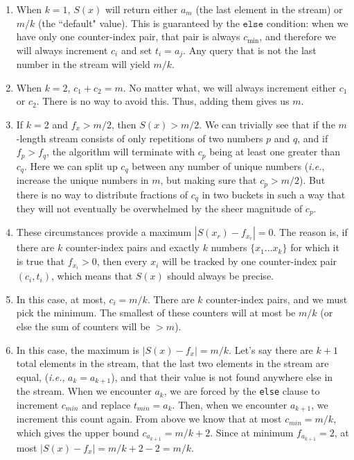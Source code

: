 \documentclass[fleqn]{article}
\begin{document}
\begin{enumerate}
\renewcommand{\labelenumi}{(\Alph{enumi})}


\item When $k=1$, $S(x)$ will return either $a_m$ (the last element in the stream) or $m/k$ (the ``default" value). This is guaranteed by the $\texttt{else}$ condition: when we have only one counter-index pair, that pair is always $c_{\mbox{min}}$, and therefore we will always increment $c_i$ and set $t_i = a_j$. Any query that is not the last number in the stream will yield $m/k$.

\item When $k=2$, $c_1 + c_2 = m$. No matter what, we will always increment either $c_1$ or $c_2$. There is no way to avoid this. Thus, adding them gives us $m$.

\item If $k=2$ and $f_x > m/2$, then $S(x) > m/2$. We can trivially see that if the $m$-length stream consists of only repetitions of two numbers $p$ and $q$, and if $f_p > f_q$, the algorithm will terminate with $c_p$ being at least one greater than $c_q$. Here we can split up $c_q$ between any number of unique numbers (\textit{i.e.}, increase the unique numbers in $m$, but making sure that $c_p > m/2$). But there is no way to distribute fractions of $c_q$ in two buckets in such a way that they will not eventually be overwhelmed by the sheer magnitude of $c_p$.

\item These circumstances provide a maximum $|S(x_r) - f_{x_r}| = 0$. The reason is, if there are $k$ counter-index pairs and exactly $k$ numbers $\{x_1 \ldots x_k\}$ for which it is true that $f_{x_i} > 0$, then every $x_i$ will be tracked by one counter-index pair $(c_i, t_i)$, which means that $S(x)$ should always be precise.

\item In this case, at most, $c_i = m/k$. There are $k$ counter-index pairs, and we must pick the minimum. The smallest of these counters will at most be $m/k$ (or else the sum of counters will be $> m$).

\item In this case, the maximum is $|S(x) - f_x| = m/k$. Let's say there are $k + 1$ total elements in the stream, that the last two elements in the stream are equal, (\textit{i.e.}, $a_k = a_{k+1}$), and that their value is not found anywhere else in the stream. When we encounter $a_k$, we are forced by the \texttt{else} clause to increment $c_{min}$ and replace $t_{min} = a_k$. Then, when we encounter $a_{k+1}$, we increment this count again. From above we know that at most $c_{min} = m/k$, which gives the upper bound $c_{a_{k+1}} = m/k + 2$. Since at minimum $f_{a_{k+1}} = 2$, at most $|S(x) - f_x| = m/k + 2 - 2 = m/k$.


\end{enumerate}
\end{document}
